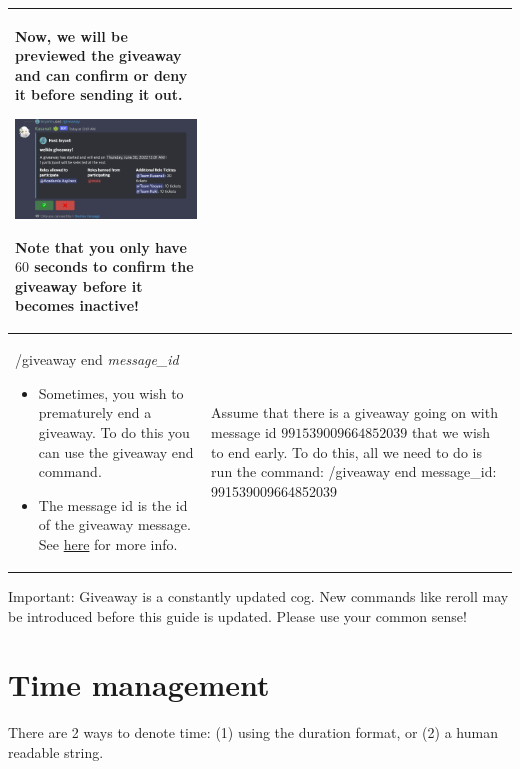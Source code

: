 \documentclass{scrartcl}
\begin{document}
\begin{tabularx}{\textwidth}{|>{\raggedright\arraybackslash}X|>{\raggedright\arraybackslash}X|}
Now, we will be previewed the giveaway and can confirm or deny it before sending it out. 
\begin{center}
    \includegraphics[width=2in]{images/giveaway.png}
\end{center}
Note that you only have $60$ seconds to confirm the giveaway before it becomes inactive!
\\
\hline 
/giveaway end \textit{message\_id}
\begin{itemize}
    \item Sometimes, you wish to prematurely end a giveaway. To do this you can use the giveaway end command.
    \item The message id is the id of the giveaway message. See \href{https://support.discord.com/hc/en-us/articles/206346498-Where-can-I-find-my-User-Server-Message-ID-}{here} for more info. 
\end{itemize}&
\vspace{0.25cm}
Assume that there is a giveaway going on with message id $991539009664852039$ that we wish to end early. To do this, all we need to do is run the command:
\newline
\vspace{0.25cm}
/giveaway end message\_id: \color{gray} 991539009664852039 \color{black}
\\
\hline
\end{tabularx}
Important: Giveaway is a constantly updated cog. New commands like reroll may be introduced before this guide is updated. Please use your common sense! 
\newpage
\section{Time management} \label{time}
There are 2 ways to denote time: (1) using the duration format, or (2) a human readable string.
\end{document}
